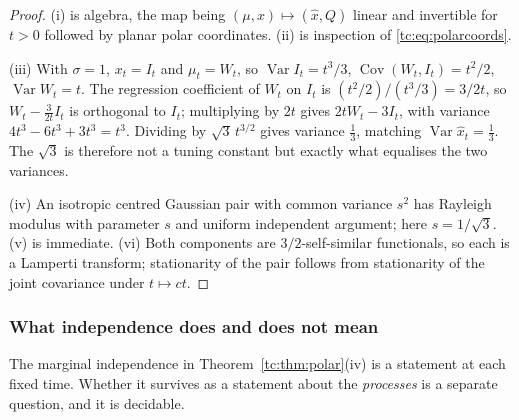 \documentclass[11pt]{article}
\numberwithin{equation}{section}
\theoremstyle{plain}
\theoremstyle{definition}
\theoremstyle{remark}
\DeclareMathOperator{\Var}{Var}
\DeclareMathOperator{\Cov}{Cov}
\begin{document}
\begin{proof}
(i) is algebra, the map being $(\mu,x)\mapsto(\hat x,Q)$ linear and
invertible for $t>0$ followed by planar polar coordinates. (ii) is
inspection of \eqref{tc:eq:polarcoords}.

(iii) With $\sigma=1$, $x_t=I_t$ and $\mu_t=W_t$, so
$\Var I_t=t^{3}/3$, $\Cov(W_t,I_t)=t^{2}/2$, $\Var W_t=t$. The
regression coefficient of $W_t$ on $I_t$ is
$(t^{2}/2)/(t^{3}/3)=3/2t$, so $W_t-\tfrac{3}{2t}I_t$ is orthogonal to
$I_t$; multiplying by $2t$ gives $2tW_t-3I_t$, with variance
$4t^{3}-6t^{3}+3t^{3}=t^{3}$. Dividing by $\sqrt3\,t^{3/2}$ gives
variance $\tfrac13$, matching $\Var\hat x_t=\tfrac13$. The $\sqrt3$ is
therefore not a tuning constant but exactly what equalises the two
variances.

(iv) An isotropic centred Gaussian pair with common variance $s^{2}$ has
Rayleigh modulus with parameter $s$ and uniform independent argument;
here $s=1/\sqrt3$. (v) is immediate. (vi) Both components are
$3/2$-self-similar functionals, so each is a Lamperti transform;
stationarity of the pair follows from stationarity of the joint
covariance under $t\mapsto ct$.
\end{proof}

\subsubsection{What independence does and does not mean}
\label{tc:subsub:indep}

The marginal independence in Theorem~\ref{tc:thm:polar}(iv) is a
statement at each fixed time. Whether it survives as a statement about
the \emph{processes} is a separate question, and it is decidable.
\end{document}
